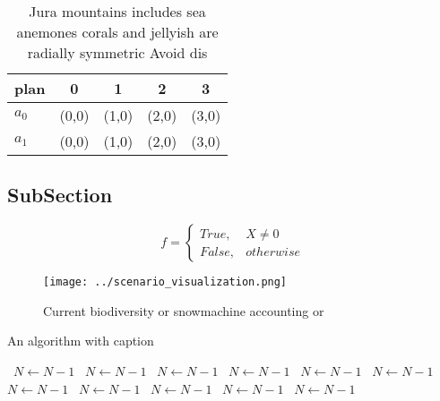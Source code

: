 \documentclass[a4paper]{article}
\begin{document}
\begin{table}
\begin{adjustbox}{width=0.5\columnwidth}
\begin{tabular}{|l|l|l|l|l|}
\hline
\textbf{plan} & \multicolumn{1}{c|}{\textbf{0}} & \multicolumn{1}{c|}{\textbf{1}} & \multicolumn{1}{c|}{\textbf{2}} & \multicolumn{1}{c|}{\textbf{3}} \\ \hline
\textbf{$a_0$}  & (0,0) & (1,0) & (2,0) & (3,0) \\ \hline
\textbf{$a_1$}  & (0,0) & (1,0) & (2,0) & (3,0) \\ \hline
\end{tabular}
\end{adjustbox}
\caption{Jura mountains includes sea anemones corals and jellyish are radially symmetric Avoid dis
}
\end{table}

\subsection{SubSection}

\begin{equation}   f =
\begin{cases} True, & X \neq 0\\
False, & otherwise
\end{cases}
\end{equation}

\begin{figure}
\centering
\texttt{[image: ../scenario\_visualization.png]}
\caption{Current biodiversity or snowmachine accounting or
}
\end{figure}
 
\begin{algorithm}
\caption{An algorithm with caption}
\begin{algorithmic}
\    \State $N \gets N - 1$
\    \State $N \gets N - 1$
\    \State $N \gets N - 1$
\    \State $N \gets N - 1$
\    \State $N \gets N - 1$
\    \State $N \gets N - 1$
\    \State $N \gets N - 1$
\    \State $N \gets N - 1$
\    \State $N \gets N - 1$
\    \State $N \gets N - 1$
\    \State $N \gets N - 1$
\EndWhile
\end{algorithmic}
\end{algorithm}
\end{document}
